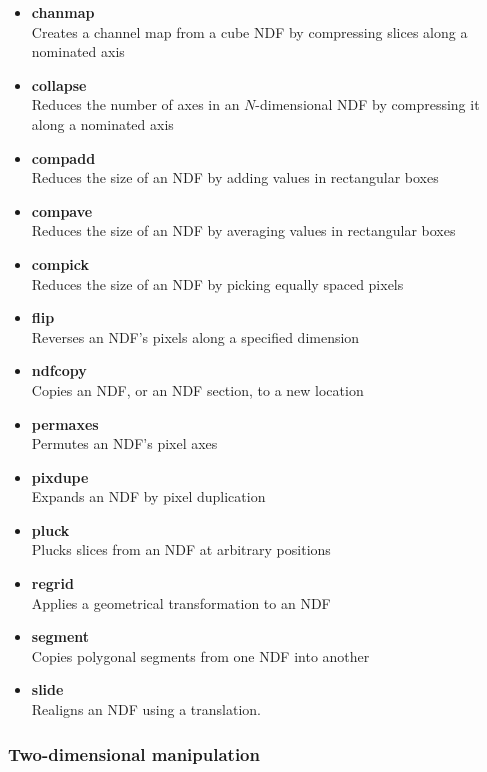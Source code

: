 \documentclass[twoside,11pt]{article}
\newcommand{\xref}[3]{#1}
\begin{document}
{\begin{itemize}
\item{\xref{{\bf chanmap}}{sun95}{CHANMAP}}\\
Creates a channel map from a cube NDF by compressing slices along a nominated axis
\item{\xref{{\bf collapse}}{sun95}{COLLAPSE}}\\
Reduces the number of axes in an $N$-dimensional NDF by compressing it along a nominated axis 
\item{\xref{{\bf compadd}}{sun95}{COMPADD}}\\
Reduces the size of an NDF by adding values in rectangular boxes 
\item{\xref{{\bf compave}}{sun95}{COMPAVE}}\\
Reduces the size of an NDF by averaging values in rectangular boxes 
\item{\xref{{\bf compick}}{sun95}{COMPICK}}\\
Reduces the size of an NDF by picking equally spaced pixels 
\item{\xref{{\bf flip}}{sun95}{FLIP}}\\
Reverses an NDF's pixels along a specified dimension 
\item{\xref{{\bf ndfcopy}}{sun95}{NDFCOPY}}\\
Copies an NDF, or an NDF section, to a new location 
\item{\xref{{\bf permaxes}}{sun95}{PERMAXES}}\\
Permutes an NDF's pixel axes
\item{\xref{{\bf pixdupe}}{sun95}{PIXDUPE}}\\
Expands an NDF by pixel duplication 
\item{\xref{{\bf pluck}}{sun95}{PLUCK}}\\
Plucks slices from an NDF at arbitrary positions
\item{\xref{{\bf regrid}}{sun95}{REGRID}}\\
Applies a geometrical transformation to an NDF
\item{\xref{{\bf segment}}{sun95}{SEGMENT}}\\
Copies polygonal segments from one NDF into another 
\item{\xref{{\bf slide}}{sun95}{SLIDE}}\\
Realigns an NDF using a translation.
\end{itemize}

\subsubsection{Two-dimensional manipulation}

}
\end{document}
